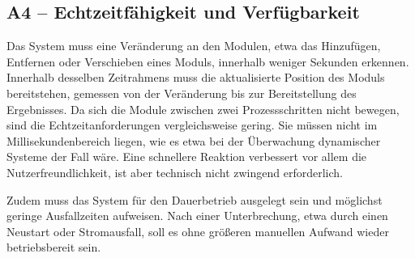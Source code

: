 \subsection{A4 -- Echtzeitfähigkeit und Verfügbarkeit}
Das System muss eine Veränderung an den Modulen, etwa das Hinzufügen, Entfernen oder Verschieben eines Moduls, innerhalb weniger Sekunden erkennen. Innerhalb desselben Zeitrahmens muss die aktualisierte Position des Moduls bereitstehen, gemessen von der Veränderung bis zur Bereitstellung des Ergebnisses. Da sich die Module zwischen zwei Prozessschritten nicht bewegen, sind die Echtzeitanforderungen vergleichsweise gering. Sie müssen nicht im Millisekundenbereich liegen, wie es etwa bei der Überwachung dynamischer Systeme der Fall wäre. Eine schnellere Reaktion verbessert vor allem die Nutzerfreundlichkeit, ist aber technisch nicht zwingend erforderlich.

Zudem muss das System für den Dauerbetrieb ausgelegt sein und möglichst geringe Ausfallzeiten aufweisen. Nach einer Unterbrechung, etwa durch einen Neustart oder Stromausfall, soll es ohne größeren manuellen Aufwand wieder betriebsbereit sein.

